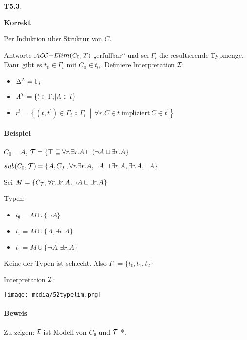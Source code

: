 \textbf{T5.3}. 

\textbf{Korrekt}

Per Induktion über Struktur von $C$.

Antworte $\text {$\mathcal{A}\mathcal{L}\mathcal{C}$}\mathrm{-}Elim(C_{0},T)$ „erfüllbar`` und sei
$\Gamma_{i}$ die resultierende Typmenge. Dann gibt es
$t_{0} \in \Gamma_{i}$ mit $C_{0} \in t_{0}$. Definiere
Interpretation $\mathcal{I}$:

\begin{itemize}
\item
  $\Delta^{\mathcal{I}} = \Gamma_{i}$
\item
  $A^\MI = \left\{ t \in \Gamma_{i} \middle| A \in t \right\}$
\item
  $r^{i} = \left\{ \left( t,t^{'} \right)\in \Gamma_i \times \Gamma_i\  \middle| \ \forall r.C \in t\ \mathrm{\text{impliziert}}\ C \in t^{'} \right\}$
\end{itemize} 

\paragraph{Beispiel}

$C_0 = A$, $\mathcal{T} = \{\top \sqsubseteq \forall r.\exists r.A \sqcap (\neg A \sqcup \exists r.A\}$

$sub(C_0, \mathcal{T}) = \{A,C_{\mathcal{T}}, \forall r.\exists r.A, \neg A \sqcup \exists r.A, \exists r.A, \neg A\}$

Sei $M = \{C_{\mathcal{T}}, \forall r.\exists r.A, \neg A \sqcup \exists r.A\}$ 

Typen:

\begin{itemize}
  \item $t_0 = M \cup \{\neg A\}$
  \item $t_1 = M \cup \{A,\exists r.A\}$
  \item $t_1 = M \cup \{\neg A,\exists r.A\}$
\end{itemize}

Keine der Typen ist schlecht. Also $\Gamma_1 = \{t_0,t_1,t_2\}$

Interpretation $\mathcal{I}$:

\texttt{[image: media/52typelim.png]}

\paragraph{Beweis}

Zu zeigen: $\mathcal{I}$ ist Modell von $C_{0}$ und $\mathcal{T}$ *.

